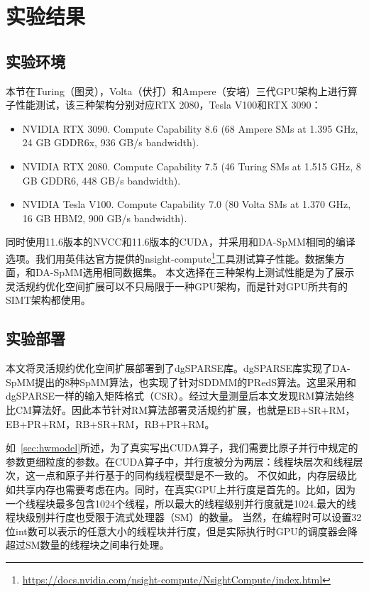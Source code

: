 \section{实验结果}
\subsection{实验环境}\label{sec:exp-env}
本节在Turing（图灵），Volta（伏打）和Ampere（安培）三代GPU架构上进行算子性能测试，该三种架构分别对应RTX 2080，Tesla V100和RTX 3090：
\begin{itemize}
\item NVIDIA RTX 3090. Compute Capability 8.6 (68 Ampere SMs at 1.395 GHz, 24 GB GDDR6x, 936 GB/s bandwidth).
\item NVIDIA RTX 2080. Compute Capability 7.5 (46 Turing SMs at
1.515 GHz, 8 GB GDDR6, 448 GB/s bandwidth).
\item NVIDIA Tesla V100. Compute Capability 7.0 (80 Volta SMs at
1.370 GHz, 16 GB HBM2, 900 GB/s bandwidth). 
\end{itemize}
同时使用11.6版本的NVCC和11.6版本的CUDA，并采用和DA-SpMM相同的编译选项。我们用英伟达官方提供的nsight-compute\footnote{\url{https://docs.nvidia.com/nsight-compute/NsightCompute/index.html}}工具测试算子性能。数据集方面，和DA-SpMM选用相同数据集。
本文选择在三种架构上测试性能是为了展示灵活规约优化空间扩展可以不只局限于一种GPU架构，而是针对GPU所共有的SIMT架构都使用。
\subsection{实验部署}\label{sec:exp}
本文将灵活规约优化空间扩展部署到了dgSPARSE库。dgSPARSE库实现了DA-SpMM提出的8种SpMM算法，也实现了针对SDDMM的PRedS算法。这里采用和dgSPARSE一样的输入矩阵格式（CSR）。经过大量测量后本文发现RM算法始终比CM算法好。因此本节针对RM算法部署灵活规约扩展，也就是EB+SR+RM，EB+PR+RM，RB+SR+RM，RB+PR+RM。

如~\ref{sec:hwmodel}所述，为了真实写出CUDA算子，我们需要比原子并行中规定的参数更细粒度的参数。在CUDA算子中，并行度被分为两层：线程块层次和线程层次，这一点和原子并行基于的同构线程模型是不一致的。
不仅如此，内存层级比如共享内存也需要考虑在内。同时，在真实GPU上并行度是首先的。比如，因为一个线程块最多包含1024个线程，所以最大的线程级别并行度就是1024.最大的线程块级别并行度也受限于流式处理器（SM）的数量。
当然，在编程时可以设置32位int数可以表示的任意大小的线程块并行度，但是实际执行时GPU的调度器会降超过SM数量的线程块之间串行处理。

